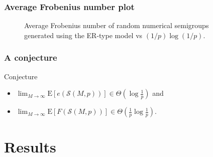 \documentclass{beamer}
\def\EE{\ensuremath{\mathrm{E}}}
\begin{document}
    \begin{frame}
        \frametitle{Average Frobenius number plot}
        \begin{figure}
            \begin{center}
                \scalebox{0.6}{}
            \end{center}
            \caption{Average Frobenius number of random numerical semigroups generated using the ER-type model vs $(1/p)\log(1/p)$.}
            \label{fig:frobenius}
        \end{figure}
    \end{frame}

    \begin{frame}
        \frametitle{A conjecture}
        \begin{block}{Conjecture}
            \begin{itemize}
                \item \(\lim_{M \to \infty} \EE[e(\mathcal{S}(M, p))] \in \Theta \left(\log\frac{1}{p}\right)\) and
                \item \(\lim_{M \to \infty} \EE[F(\mathcal{S}(M, p))] \in \Theta \left(\frac{1}{p}\log\frac{1}{p}\right).\)
            \end{itemize}
            
            
        \end{block}
        
    \end{frame}


\section{Results}
\end{document}
